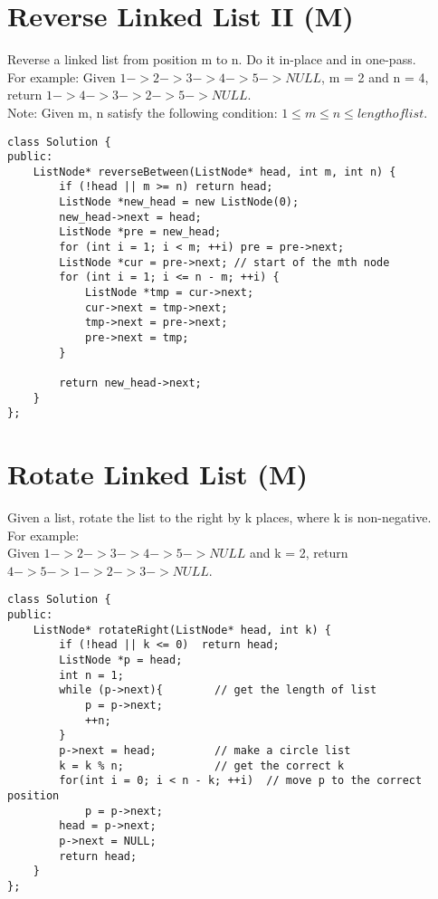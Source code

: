 \section{Reverse Linked List II (M)}
Reverse a linked list from position m to n. Do it in-place and in one-pass.\\

For example:
Given $1->2->3->4->5->NULL$, m = 2 and n = 4,
return $1->4->3->2->5->NULL$.\\

Note:
Given m, n satisfy the following condition:
$1 \leq m \leq n \leq length of list$. \\

\begin{lstlisting}
class Solution {
public:
    ListNode* reverseBetween(ListNode* head, int m, int n) {
        if (!head || m >= n) return head;
        ListNode *new_head = new ListNode(0);
        new_head->next = head;
        ListNode *pre = new_head;
        for (int i = 1; i < m; ++i) pre = pre->next;
        ListNode *cur = pre->next; // start of the mth node
        for (int i = 1; i <= n - m; ++i) {
            ListNode *tmp = cur->next;
            cur->next = tmp->next;
            tmp->next = pre->next;
            pre->next = tmp;
        }
        
        return new_head->next;
    }
};
\end{lstlisting}


\section{Rotate Linked List (M)}
Given a list, rotate the list to the right by k places, where k is non-negative.\\

For example:\\
Given $1->2->3->4->5->NULL$ and k = 2, return $4->5->1->2->3->NULL$.\\

\begin{lstlisting}
class Solution {
public:
    ListNode* rotateRight(ListNode* head, int k) {
        if (!head || k <= 0)  return head;
        ListNode *p = head;
        int n = 1;
        while (p->next){        // get the length of list
            p = p->next;
            ++n;
        }
        p->next = head;         // make a circle list
        k = k % n;              // get the correct k
        for(int i = 0; i < n - k; ++i)  // move p to the correct position
            p = p->next;
        head = p->next;
        p->next = NULL;
        return head;
    }
};
\end{lstlisting}


